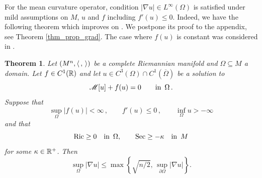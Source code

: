 \documentclass[10 pt,a4paper]{article}
\newtheorem{theorem}[definition]{Theorem}
\newtheorem{example}[definition]{Example}
\theoremstyle{definition}
\begin{document}
For the mean curvature operator, condition $|\nabla u| \in L^\infty(\Omega)$ is satisfied under mild assumptions on $M$, $u$ and $f$ including $f'(u) \le 0$. Indeed, we have the following theorem which improves on \cite[Theorem 1.5]{lian_sicbaldi}. We postpone its proof to the appendix, see Theorem \ref{thm_prop_grad}. The case where $f(u)$ is constant was considered in \cite{cmmr,cmr}.

\begin{theorem} \label{prop_grad}
	Let $(M^n,\langle \, , \, \rangle)$ be a complete Riemannian manifold and $\Omega\subseteq M$ a domain. Let $f\in C^1(\mathbb R)$ and let $u\in C^3(\Omega) \cap C^1(\overline{\Omega})$ be a solution to
	\[
		\mathscr{M}[u] + f(u) = 0 \qquad \text{in } \, \Omega \, .
	\]
	Suppose that
	\[
		\sup_\Omega |f(u)| < \infty \, , \qquad f'(u) \leq 0 \, , \qquad \inf_\Omega u > -\infty
	\]
	and that
	\[
		\mathrm{Ric} \geq 0 \quad \text{in } \, \Omega , \qquad \mathrm{Sec} \geq - \kappa \quad \text{in } \, M
	\]
	for some $\kappa\in\mathbb R^+$. Then
	\[
		\sup_\Omega |\nabla u| \leq \max\left\{ \sqrt{n/2}, \, \sup_{\partial\Omega} |\nabla u|\right\} .
	\]
\end{theorem}


%
\end{document}
